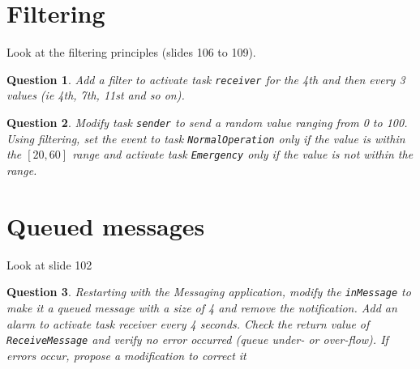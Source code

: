 \documentclass[11pt]{article}
\newtheorem{ex}{Question}
\begin{document}
\section{Filtering}

Look at the filtering principles (slides 106 to 109).

\begin{ex}
Add a filter to activate task \texttt{receiver} for the 4th and then every 3 values (ie 4th, 7th, 11st and so on).
\end{ex}
\begin{ex}
Modify task \texttt{sender} to send a random value ranging from 0 to 100. Using filtering, set the event to task \texttt{NormalOperation} only if the value is within the $[20,60]$ range and activate task \texttt{Emergency} only if the value is not within the range.
\end{ex}

\section{Queued messages}

Look at slide 102

\begin{ex}Restarting with the Messaging application, modify the \texttt{inMessage} to make it a queued message with a size of 4 and remove the notification. Add an alarm to activate task receiver every 4 seconds. Check the return value of \texttt{ReceiveMessage} and verify no error occurred (queue under- or over-flow).
If errors occur, propose a modification to correct it
\end{ex}
\end{document}
